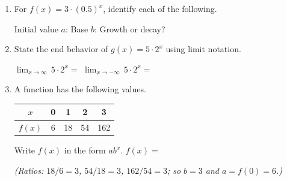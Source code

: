 \documentclass[10pt]{article}
\begin{document}
\namedateperiod

\vspace{0.16in}

\begin{enumerate}[itemsep=18pt]

\item For $f(x) = 3 \cdot (0.5)^x$, identify each of the following.

      \medskip
      Initial value $a$:  \quad
      Base $b$:  \quad
      Growth or decay? 

\item State the end behavior of $g(x) = 5 \cdot 2^x$ using limit notation.

      \medskip
      $\displaystyle\lim_{x \to \infty}\, 5 \cdot 2^x = $ \ans{$\infty$}
      \qquad
      $\displaystyle\lim_{x \to -\infty}\, 5 \cdot 2^x = $ 

\item A function has the following values.

      \renewcommand{\arraystretch}{1.4}
      \begin{tabular}{|c|c|c|c|c|}
        \hline
        $x$    & 0 & 1  & 2  & 3   \\
        \hline
        $f(x)$ & 6 & 18 & 54 & 162 \\
        \hline
      \end{tabular}

      \vspace{0.08in}
      Write $f(x)$ in the form $ab^x$. \quad $f(x) = $ 

      \smallskip
      {\small\color{charcoal}\textit{(Ratios: $18/6 = 3$, $54/18 = 3$, $162/54 = 3$; so $b = 3$ and $a = f(0) = 6$.)}}

\end{enumerate}
\end{document}
